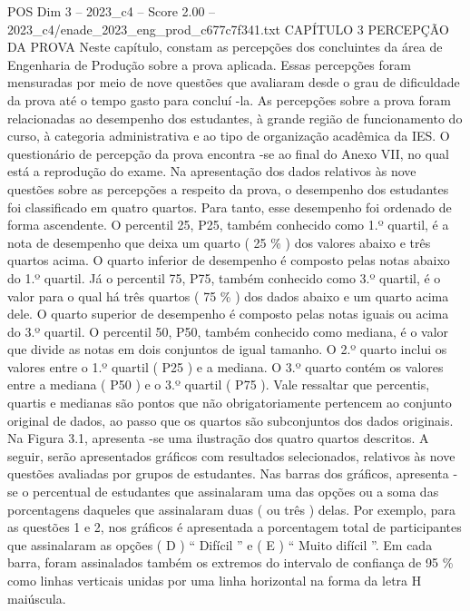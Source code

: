 \begin{textsample}{POS Dim 3 – 2023\_c4 – Score 2.00 – 2023\_c4/enade\_2023\_eng\_prod\_c677c7f341.txt}  \label{ex:f3_pos_099}
CAPÍTULO 3 PERCEPÇÃO DA PROVA Neste capítulo, constam as percepções dos concluintes da área de Engenharia de Produção sobre a prova aplicada.
Essas percepções foram mensuradas por meio de nove questões que avaliaram desde o grau de dificuldade da prova até o tempo gasto para concluí -la.
As percepções sobre a prova foram relacionadas ao desempenho dos estudantes, à grande região de funcionamento do curso, à categoria administrativa e ao tipo de organização acadêmica da IES.
O questionário de percepção da prova encontra -se ao final do Anexo VII, no qual está a reprodução do exame.
Na apresentação dos dados relativos às nove questões sobre as percepções a respeito da prova, o desempenho dos estudantes foi classificado em quatro quartos.
Para tanto, esse desempenho foi ordenado de forma ascendente.
O percentil 25, P25, também conhecido como 1.º quartil, é a nota de desempenho que deixa um quarto ( 25 \% ) dos valores abaixo e três quartos acima.
O quarto inferior de desempenho é composto pelas notas abaixo do 1.º quartil.
Já o percentil 75, P75, também conhecido como 3.º quartil, é o valor para o qual há três quartos ( 75 \% ) dos dados abaixo e um quarto acima dele.
O quarto superior de desempenho é composto pelas notas iguais ou acima do 3.º quartil.
O percentil 50, P50, também conhecido como mediana, é o valor que divide as notas em dois conjuntos de igual tamanho.
O 2.º quarto inclui os valores entre o 1.º quartil ( P25 ) e a mediana.
O 3.º quarto contém os valores entre a mediana ( P50 ) e o 3.º quartil ( P75 ).
Vale ressaltar que percentis, quartis e medianas são pontos que não obrigatoriamente pertencem ao conjunto original de dados, ao passo que os quartos são subconjuntos dos dados originais.
Na Figura 3.1, apresenta -se uma ilustração dos quatro quartos descritos.
A seguir, serão apresentados gráficos com resultados selecionados, relativos às nove questões avaliadas por grupos de estudantes.
Nas barras dos gráficos, apresenta -se o percentual de estudantes que assinalaram uma das opções ou a soma das porcentagens daqueles que assinalaram duas ( ou três ) delas.
Por exemplo, para as questões 1 e 2, nos gráficos é apresentada a porcentagem total de participantes que assinalaram as opções ( D ) “ Difícil ” e ( E ) “ Muito difícil ”.
Em cada barra, foram assinalados também os extremos do intervalo de confiança de 95 \% como linhas verticais unidas por uma linha horizontal na forma da letra H maiúscula.

\end{textsample}
